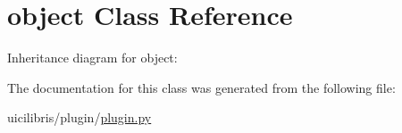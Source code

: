 \hypertarget{classobject}{\section{object \-Class \-Reference}
\label{classobject}
}


\-Inheritance diagram for object\-:


\-The documentation for this class was generated from the following file\-:\begin{DoxyCompactItemize}
\item 
uicilibris/plugin/\hyperlink{plugin_8py}{plugin.\-py}\end{DoxyCompactItemize}
